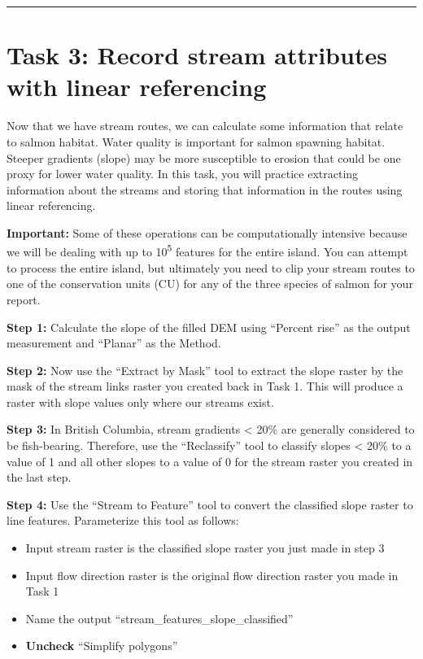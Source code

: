 \documentclass[
]{book}
\begin{document}
\begin{center}\rule{0.5\linewidth}{0.5pt}\end{center}

\hypertarget{task-3-record-stream-attributes-with-linear-referencing}{%
\section*{Task 3: Record stream attributes with linear referencing}\label{task-3-record-stream-attributes-with-linear-referencing}}

Now that we have stream routes, we can calculate some information that relate to salmon habitat. Water quality is important for salmon spawning habitat. Steeper gradients (slope) may be more susceptible to erosion that could be one proxy for lower water quality. In this task, you will practice extracting information about the streams and storing that information in the routes using linear referencing.

\textbf{Important:} Some of these operations can be computationally intensive because we will be dealing with up to 10\textsuperscript{5} features for the entire island. You can attempt to process the entire island, but ultimately you need to clip your stream routes to one of the conservation units (CU) for any of the three species of salmon for your report.

\textbf{Step 1:} Calculate the slope of the filled DEM using ``Percent rise'' as the output measurement and ``Planar'' as the Method.

\textbf{Step 2:} Now use the ``Extract by Mask'' tool to extract the slope raster by the mask of the stream links raster you created back in Task 1. This will produce a raster with slope values only where our streams exist.

\textbf{Step 3:} In British Columbia, stream gradients \textless{} 20\% are generally considered to be fish-bearing. Therefore, use the ``Reclassify'' tool to classify slopes \textless{} 20\% to a value of 1 and all other slopes to a value of 0 for the stream raster you created in the last step.

\textbf{Step 4:} Use the ``Stream to Feature'' tool to convert the classified slope raster to line features. Parameterize this tool as follows:

\begin{itemize}
\item
  Input stream raster is the classified slope raster you just made in step 3
\item
  Input flow direction raster is the original flow direction raster you made in Task 1
\item
  Name the output ``stream\_features\_slope\_classified''
\item
  \textbf{Uncheck} ``Simplify polygons''
\end{itemize}
\end{document}
